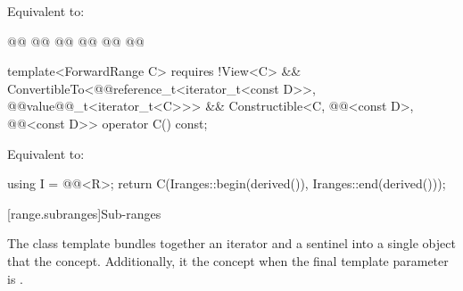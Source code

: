 \begin{itemdescr}
\pnum
{}

\pnum
\effects Equivalent to: 
\end{itemdescr}

%
\begin{itemdecl}
@@
  @@
@@
@@
  @@
@@
\end{itemdecl}

\begin{itemdescr}
\pnum
{}

\pnum
{}
\end{itemdescr}

%
\begin{itemdecl}
template<ForwardRange C>
  requires !View<C> &&
    ConvertibleTo<@@reference_t<iterator_t<const D>>,
      @@value@@_t<iterator_t<C>>> &&
    Constructible<C, @@<const D>,
      @@<const D>>
operator C() const;
\end{itemdecl}

\begin{itemdescr}
\pnum
\effects Equivalent to:
\begin{codeblock}
using I = @@<R>;
return C(I{ranges::begin(derived())}, I{ranges::end(derived())});
\end{codeblock}
\end{itemdescr}


[range.subranges]{Sub-ranges}

\pnum
The  class template bundles together an
iterator and a sentinel into a single object that   the
 concept. Additionally, it   the
 concept when the final template parameter is
.

